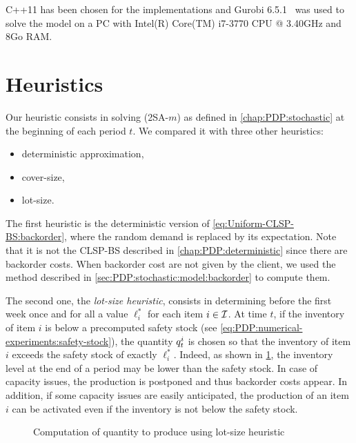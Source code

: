 C++11 has been chosen for the implementations and Gurobi 6.5.1~\cite{gurobi} was used to solve the model on a PC with Intel(R) Core(TM) i7-3770 CPU @ 3.40GHz and 8Go RAM.




\section{Heuristics}


Our heuristic consists in solving (2SA-$m$) as defined in \cref{chap:PDP:stochastic} at the beginning of each period $t$.
We compared it with three other heuristics:
\begin{itemize}
  \item deterministic approximation,
  \item cover-size,
  \item lot-size.
\end{itemize}


The first heuristic is the deterministic version of \eqref{eq:Uniform-CLSP-BS:backorder}, where the random demand is replaced by its expectation.
Note that it is not the CLSP-BS described in \cref{chap:PDP:deterministic} since there are backorder costs.
When backorder cost are not given by the client, we used the method described in \cref{sec:PDP:stochastic:model:backorder} to compute them.


The second one, the {\em lot-size heuristic}, consists in determining before the first week once and for all a value $\ell_i^*$ for each item $i\in\mathcal{I}$.
At time $t$, if the inventory of item $i$ is below a precomputed safety stock (see \cref{eq:PDP:numerical-experiments:safety-stock}), the quantity $q_t^i$ is chosen so that the inventory of item $i$ exceeds the safety stock of exactly $\ell_i^*$.
Indeed, as shown in \cref{fig:lot-size-production}, the inventory level at the end of a period may be lower than the safety stock.
In case of capacity issues, the production is postponed and thus backorder costs appear.
In addition, if some capacity issues are easily anticipated, the production of an item $i$ can be activated even if the inventory is not below the safety stock.

\begin{figure}[h]
  \centering
  \caption{Computation of quantity to produce using lot-size heuristic}
  \label{fig:lot-size-production}
\end{figure}

